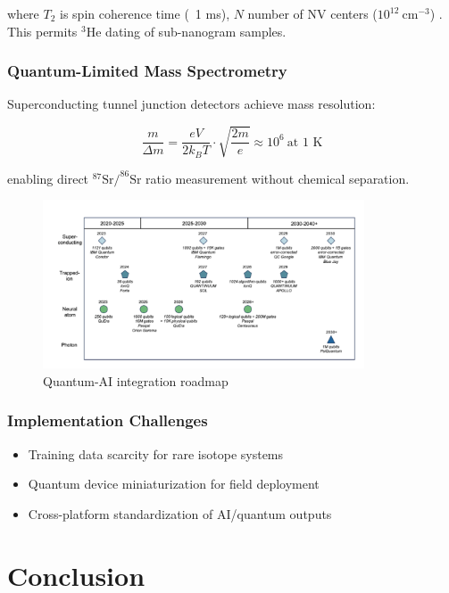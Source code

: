 \documentclass{article}
\begin{document}
where \(T_2\) is spin coherence time (~1 ms), \(N\) number of NV centers (\(10^{12}\ \text{cm}^{-3}\)) \cite{Rondin2014}. This permits \(^{3}\text{He}\) dating of sub-nanogram samples.

\subsubsection*{Quantum-Limited Mass Spectrometry}
Superconducting tunnel junction detectors achieve mass resolution:

\begin{equation}
\frac{m}{\Delta m} = \frac{eV}{2k_BT} \cdot \sqrt{\frac{2m}{e}} \approx 10^6\ \text{at 1 K}
\label{eq:quantum_ms}
\end{equation}

enabling direct \(^{87}\text{Sr}/^{86}\text{Sr}\) ratio measurement without chemical separation.

\begin{figure}[htbp]
    \centering
    \includegraphics[width=0.85\textwidth]{quantum_ai.png}
    \caption{Quantum-AI integration roadmap}
    \label{fig:quantum_ai}
\end{figure}

\subsubsection*{Implementation Challenges}
\begin{itemize}
    \item Training data scarcity for rare isotope systems
    \item Quantum device miniaturization for field deployment
    \item Cross-platform standardization of AI/quantum outputs
\end{itemize}

\section{Conclusion}
\end{document}
